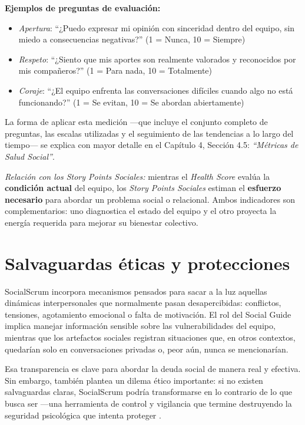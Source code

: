 \textbf{Ejemplos de preguntas de evaluación:}
\begin{itemize}
    \item \textit{Apertura}: ``¿Puedo expresar mi opinión con sinceridad dentro del equipo, sin miedo a consecuencias negativas?'' (1 = Nunca, 10 = Siempre)
    \item \textit{Respeto}: ``¿Siento que mis aportes son realmente valorados y reconocidos por mis compañeros?'' (1 = Para nada, 10 = Totalmente)
    \item \textit{Coraje}: ``¿El equipo enfrenta las conversaciones difíciles cuando algo no está funcionando?'' (1 = Se evitan, 10 = Se abordan abiertamente)
\end{itemize}

La forma de aplicar esta medición —que incluye el conjunto completo de preguntas, las escalas utilizadas y el seguimiento de las tendencias a lo largo del tiempo— se explica con mayor detalle en el Capítulo 4, Sección 4.5: \textit{``Métricas de Salud Social''}.

\emph{Relación con los Story Points Sociales:} mientras el \textit{Health Score} evalúa la \textbf{condición actual} del equipo, los \textit{Story Points Sociales} estiman el \textbf{esfuerzo necesario} para abordar un problema social o relacional. Ambos indicadores son complementarios: uno diagnostica el estado del equipo y el otro proyecta la energía requerida para mejorar su bienestar colectivo.

\FloatBarrier

\section{Salvaguardas éticas y protecciones}

SocialScrum incorpora mecanismos pensados para sacar a la luz aquellas dinámicas interpersonales que normalmente pasan desapercibidas: conflictos, tensiones, agotamiento emocional o falta de motivación. El rol del Social Guide implica manejar información sensible sobre las vulnerabilidades del equipo, mientras que los artefactos sociales registran situaciones que, en otros contextos, quedarían solo en conversaciones privadas o, peor aún, nunca se mencionarían.

Esa transparencia es clave para abordar la deuda social de manera real y efectiva. Sin embargo, también plantea un dilema ético importante: si no existen salvaguardas claras, SocialScrum podría transformarse en lo contrario de lo que busca ser —una herramienta de control y vigilancia que termine destruyendo la seguridad psicológica que intenta proteger \cite{mayer_integrative_1995}.

